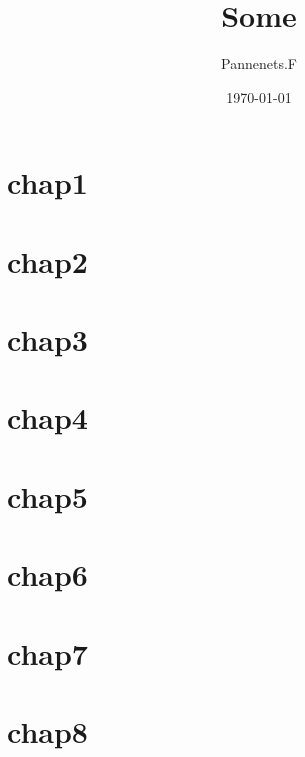 \documentclass[en,11pt,english,black,simple,device=ppt]{elegantbook}
\title{Some}
\author{Pannenets.F}
\date{\today}
\begin{document}
\maketitle
\frontmatter

\mainmatter

\section{chap1}



\section{chap2}



\section{chap3}



\section{chap4}



\section{chap5}



\section{chap6}



\section{chap7}



\section{chap8}


\end{document}
